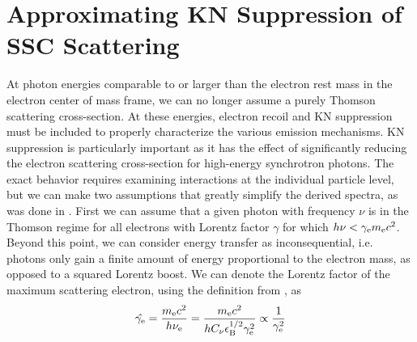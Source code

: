 \documentclass[fleqn,usenatbib]{mnras}
\begin{document}


\section{Approximating KN Suppression of SSC Scattering}\label{KNsec}

At photon energies comparable to or larger than the electron rest mass in the electron center of mass frame, we can no longer assume a purely Thomson scattering cross-section. At these energies, electron recoil and KN suppression must be included to properly characterize the various emission mechanisms. KN suppression is particularly important as it has the effect of significantly reducing the electron scattering cross-section for high-energy synchrotron photons.  The exact behavior requires examining interactions at the individual particle level, but we can make two assumptions that greatly simplify the derived spectra, as was done in \citet{Nakar}. First we can assume that a given photon with frequency $\nu$ is in the Thomson regime for all electrons with Lorentz factor $\gamma$ for which $h \nu < \gamma_{\rm e} m_{\rm e}c^2$. Beyond this point, we can consider energy transfer as inconsequential, i.e. photons only gain a finite amount of energy proportional to the electron mass, as opposed to a squared Lorentz boost. We can denote the Lorentz factor of the maximum scattering electron, using the definition from \citet{Nakar}, as  
\begin{equation}
\hat{\gamma_{\rm e}}=\frac{m_{\rm e} c^2}{h \nu_{\rm e}}=\frac{m_{\rm e} c^2}{h C_{\nu}\epsilon_{\rm B}^{1/2}\gamma_{\rm e}^2} \propto \frac{1}{\gamma_{\rm e}^2}
\end{equation} 
\end{document}
